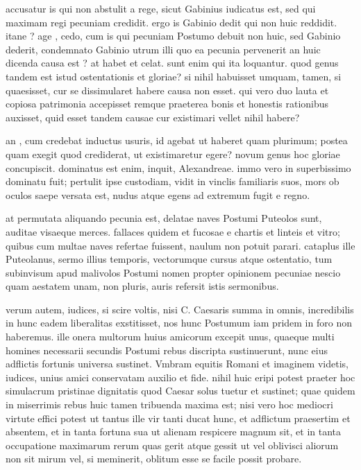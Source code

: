  accusatur is qui non abstulit a rege, sicut Gabinius iudicatus est, sed qui maximam regi pecuniam credidit. ergo is Gabinio dedit qui non huic reddidit. itane ? age , cedo, cum is qui pecuniam Postumo debuit non huic, sed Gabinio dederit, condemnato Gabinio utrum illi quo ea pecunia pervenerit an huic dicenda causa est ? at habet et celat. sunt enim qui ita loquantur. quod genus tandem est istud ostentationis et gloriae? si nihil habuisset umquam, tamen, si quaesisset, cur se dissimularet habere causa non esset. qui vero duo lauta et copiosa patrimonia accepisset remque praeterea bonis et honestis rationibus auxisset, quid esset tandem causae cur existimari vellet nihil habere?

 an , cum credebat inductus usuris, id agebat ut haberet quam plurimum; postea quam exegit quod crediderat, ut existimaretur egere? novum genus hoc gloriae concupiscit. dominatus est enim, inquit, Alexandreae. immo vero in superbissimo dominatu fuit; pertulit ipse custodiam, vidit in vinclis familiaris suos, mors ob oculos saepe versata est, nudus atque egens ad extremum fugit e regno.

 at permutata aliquando pecunia est, delatae naves Postumi Puteolos sunt, auditae visaeque merces. fallaces quidem et fucosae e chartis et linteis et vitro; quibus cum multae naves refertae fuissent, naulum non potuit parari. cataplus ille Puteolanus, sermo illius temporis, vectorumque cursus atque ostentatio, tum subinvisum apud malivolos Postumi nomen propter opinionem pecuniae nescio quam aestatem unam, non pluris, auris refersit istis sermonibus.

 verum autem, iudices, si scire voltis, nisi C. Caesaris summa in omnis, incredibilis in hunc eadem liberalitas exstitisset, nos hunc Postumum iam pridem in foro non haberemus. ille onera multorum huius amicorum excepit unus, quaeque multi homines necessarii secundis Postumi rebus discripta sustinuerunt, nunc eius adflictis fortunis universa sustinet. Vmbram equitis Romani et imaginem videtis, iudices, unius amici conservatam auxilio et fide. nihil huic eripi potest praeter hoc simulacrum pristinae dignitatis quod Caesar solus tuetur et sustinet; quae quidem in miserrimis rebus huic tamen tribuenda maxima est; nisi vero hoc mediocri virtute effici potest ut tantus ille vir tanti ducat hunc, et adflictum praesertim et absentem, et in tanta fortuna sua ut alienam respicere magnum sit, et in tanta occupatione maximarum rerum quas gerit atque gessit ut vel oblivisci aliorum non sit mirum vel, si meminerit, oblitum esse se facile possit probare.

